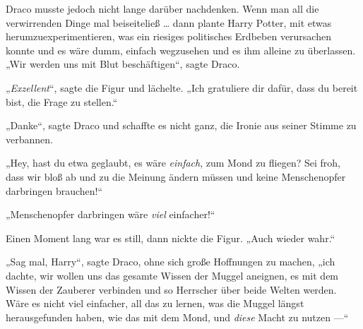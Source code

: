 Draco musste jedoch nicht lange darüber nachdenken. Wenn man all die verwirrenden Dinge mal beiseiteließ … dann plante Harry Potter, mit etwas herumzuexperimentieren, was ein riesiges politisches Erdbeben verursachen konnte und es wäre dumm, einfach wegzusehen und es ihm alleine zu überlassen.
„Wir werden uns mit Blut beschäftigen“, sagte Draco.

„\emph{Exzellent}“, sagte die Figur und lächelte.
„Ich gratuliere dir dafür, dass du bereit bist, die Frage zu stellen.“

„Danke“, sagte Draco und schaffte es nicht ganz, die Ironie aus seiner Stimme zu verbannen.

„Hey, hast du etwa geglaubt, es wäre \emph{einfach}, zum Mond zu fliegen? Sei froh, dass wir bloß ab und zu die Meinung ändern müssen und keine Menschenopfer darbringen brauchen!“

„Menschenopfer darbringen wäre \emph{viel} einfacher!“

Einen Moment lang war es still, dann nickte die Figur.
„Auch wieder wahr.“

„Sag mal, Harry“, sagte Draco, ohne sich große Hoffnungen zu machen, „ich dachte, wir wollen uns das gesamte Wissen der Muggel aneignen, es mit dem Wissen der Zauberer verbinden und so Herrscher über beide Welten werden. Wäre es nicht viel einfacher, all das zu lernen, was die Muggel längst herausgefunden haben, wie das mit dem Mond, und \emph{diese} Macht zu nutzen —“

